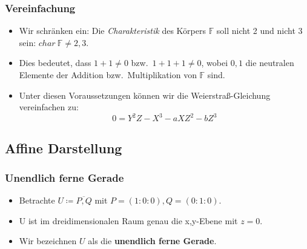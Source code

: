 \documentclass{beamer}
\theoremstyle{plain}
\theoremstyle{definition}
\theoremstyle{rem}
\begin{document}
\begin{frame}
\frametitle{Vereinfachung}
\begin{itemize}[<+->]
	\item  Wir schränken ein: Die \textit{Charakteristik} des Körpers $\mathbb{F}$ soll nicht 2 und nicht 3 sein: $char \: \mathbb{F} \neq 2,3$.
	\item Dies bedeutet, dass $1 + 1 \neq 0$ bzw.\ $1 + 1 + 1 \neq 0$, wobei $0,1$ die neutralen Elemente der Addition bzw.\ Multiplikation von $\mathbb{F}$ sind.
	\item Unter diesen Voraussetzungen können wir die Weierstraß-Gleichung vereinfachen zu:
    \begin{equation*}
        0=Y^2Z - X^3 - aXZ^2 - bZ^3
    \end{equation*}
\end{itemize}
\end{frame}

\subsection{Affine Darstellung}

\begin{frame}
\frametitle{Unendlich ferne Gerade}
\begin{itemize}[<+->]
	\item Betrachte $U\coloneqq\overline{P,Q}$ mit $P=(1:0:0),Q=(0:1:0)$.
	\item U ist im dreidimensionalen Raum genau die x,y-Ebene mit $z=0$.
		\begin{figure}[H]
		\end{figure}
	\item Wir bezeichnen $U$ als die \textbf{unendlich ferne Gerade}.
\end{itemize}
\end{frame}
\end{document}
